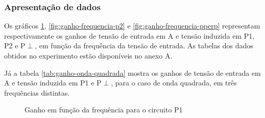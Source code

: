 \documentclass[12pt]{article}
\begin{document}
\subsubsection{Apresentação de dados}

Os gráficos \ref{fig:ganho-frequencia-p1}, \ref{fig:ganho-frequencia-p2} e
\ref{fig:ganho-frequencia-pperp} representam respectivamente os ganhos de
tensão de entrada em A e tensão induzida em P1, P2 e P$\perp$, em função da
frequência da tensão de entrada. As tabelas dos dados obtidos no
experimento estão disponíveis no anexo A.

Já a tabela \ref{tab:ganho-onda-quadrada} mostra os ganhos de tensão
de entrada em A e tensão induzida em P1 e P$\perp$, para o caso de
onda quadrada, em três frequências distintas.

\begin{figure}[H]
  \captionsetup{name=Gráfico}
  \centering
  \caption{Ganho em função da frequência para o circuito P1}
  \label{fig:ganho-frequencia-p1} %
\end{figure}
\end{document}
